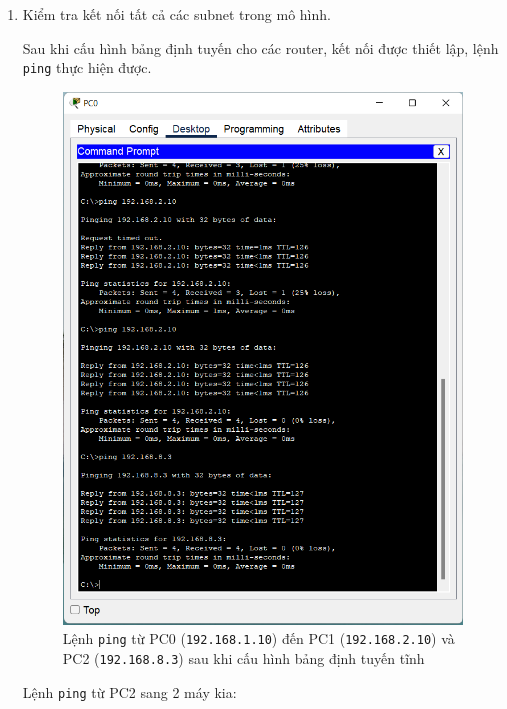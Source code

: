 \begin{enumerate}
\bf \item Kiểm tra kết nối tất cả các subnet trong mô hình.

\rm Sau khi cấu hình bảng định tuyến cho các router, kết nối được thiết lập, lệnh \texttt{ping} thực hiện được.

\begin{figure}[H]
\begin{center}
\includegraphics[scale=1]{../figures/p1/p1-70}
\end{center}
\caption{Lệnh \texttt{ping} từ PC0 (\texttt{192.168.1.10}) đến PC1 (\texttt{192.168.2.10}) và PC2 (\texttt{192.168.8.3}) sau khi cấu hình bảng định tuyến tĩnh}
\end{figure}

Lệnh \texttt{ping} từ PC2 sang 2 máy kia:


\end{enumerate}
